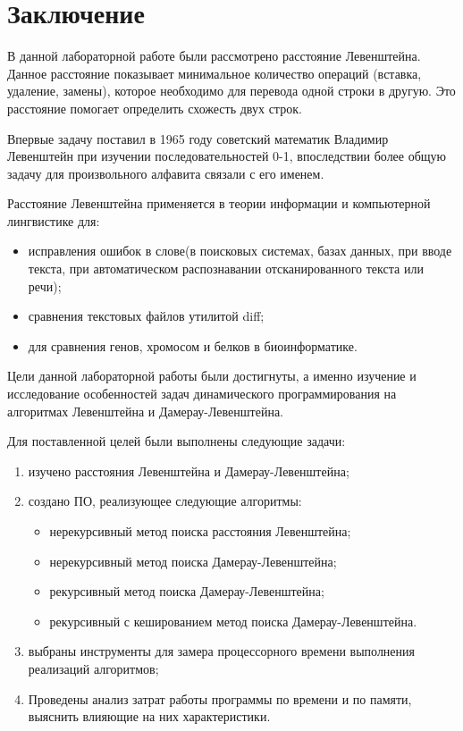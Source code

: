 \chapter*{Заключение}
В данной лабораторной работе были рассмотрено расстояние Левенштейна. Данное расстояние показывает минимальное количество операций (вставка, удаление, замены), которое необходимо для перевода одной строки в другую. Это расстояние помогает определить схожесть двух строк.

Впервые задачу поставил в 1965 году советский математик Владимир Левенштейн при изучении последовательностей 0-1, впоследствии более общую задачу для произвольного алфавита связали с его именем.

Расстояние Левенштейна применяется в теории информации и компьютерной лингвистике для:
\begin{itemize}
	\item исправления ошибок в слове(в поисковых системах, базах данных, при вводе текста, при автоматическом распознавании отсканированного текста или речи);
	\item сравнения текстовых файлов утилитой diff;
	\item для сравнения генов, хромосом и белков в биоинформатике.
\end{itemize}

Цели данной лабораторной работы были достигнуты, а именно изучение и исследование особенностей задач динамического программирования на алгоритмах Левенштейна и Дамерау-Левенштейна.

Для поставленной целей были выполнены следующие задачи:
\begin{enumerate}[label={\arabic*)}]
	\item изучено расстояния Левенштейна и Дамерау-Левенштейна;
	\item создано ПО, реализующее следующие алгоритмы:
	\begin{itemize}
		\item нерекурсивный метод поиска расстояния Левенштейна;
		\item нерекурсивный метод поиска Дамерау-Левенштейна;
		\item рекурсивный метод поиска Дамерау-Левенштейна;
		\item  рекурсивный с кешированием метод поиска Дамерау-Левенштейна.
	\end{itemize}
	\item выбраны инструменты для замера процессорного времени выполнения реализаций алгоритмов;
	\item Проведены анализ затрат работы программы по времени и по памяти, выяснить влияющие на них характеристики. 
\end{enumerate}